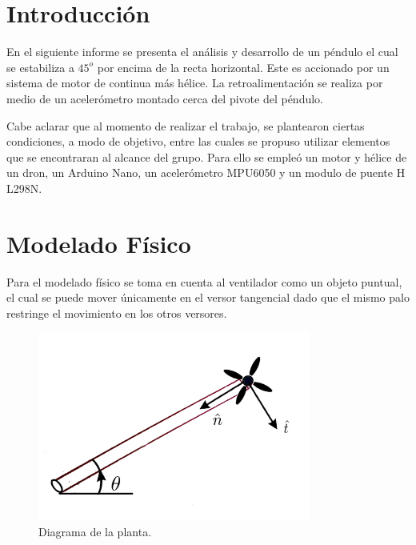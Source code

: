 







\tableofcontents
\newpage



\section{Introducción}

En el siguiente informe se presenta el análisis y desarrollo de un péndulo el cual se estabiliza a $45^o$ por encima de la recta horizontal. Este es accionado por un sistema de motor de continua más hélice. La retroalimentación se realiza por medio de un acelerómetro montado cerca del pivote del péndulo.

Cabe aclarar que al momento de realizar el trabajo, se plantearon ciertas condiciones, a modo de objetivo, entre las cuales se propuso utilizar elementos que se encontraran al alcance del grupo. Para ello se empleó un motor y hélice de un dron, un Arduino Nano, un acelerómetro MPU6050 y un modulo de puente H L298N.

\section{Modelado Físico}
Para el modelado físico se toma en cuenta al ventilador como un objeto puntual, el cual se puede mover únicamente en el versor tangencial dado que el mismo palo restringe el movimiento en los otros versores.\\

\begin{figure}[H]
    \centering
    \includegraphics[width=0.8\textwidth]{./Imagenes/y_el_trozzo.png}
    \caption{Diagrama de la planta.}
    \label{fig:Sys}
\end{figure}

